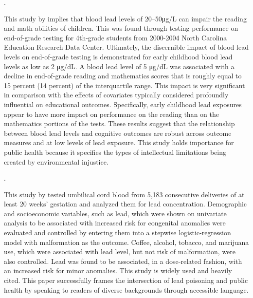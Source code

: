 \documentclass{article}
\begin{document}
\medskip

\noindent {}. 

\medskip

This study by \cite{miranda2007} implies that blood lead levels of 20–50μg/L can impair the reading and math abilities of children. This was found through testing performance on end-of-grade testing for 4th-grade students from 2000-2004 North Carolina Education Research Data Center. Ultimately, the discernible impact of blood lead levels on end-of-grade testing is demonstrated for early childhood blood lead levels as low as 2 μg/dL. A blood lead level of 5 μg/dL was associated with a decline in end-of-grade reading and mathematics scores that is roughly equal to 15 percent (14 percent) of the interquartile range. This impact is very significant in comparison with the effects of covariates typically considered profoundly influential on educational outcomes. Specifically, early childhood lead exposures appear to have more impact on performance on the reading than on the mathematics portions of the tests. These results suggest that the relationship between blood lead levels and cognitive outcomes are robust across outcome measures and at low levels of lead exposure. This study holds importance for public health because it specifies the types of intellectual limitations being created by environmental injustice. 

\medskip

\noindent {}. 

\medskip

This study by \cite{needleman_1984} tested umbilical cord blood from 5,183 consecutive deliveries of at least 20 weeks' gestation and analyzed them for lead concentration. Demographic and socioeconomic variables, such as lead, which were shown on univariate analysis to be associated with increased risk for congenital anomalies were evaluated and controlled by entering them into a stepwise logistic-regression model with malformation as the outcome. Coffee, alcohol, tobacco, and marijuana use, which were associated with lead level, but not risk of malformation, were also controlled. Lead was found to be associated, in a dose-related fashion, with an increased risk for minor anomalies. This study is widely used and heavily cited. This paper successfully frames the intersection of lead poisoning and public health by speaking to readers of diverse backgrounds through accessible language.

\medskip
\end{document}
